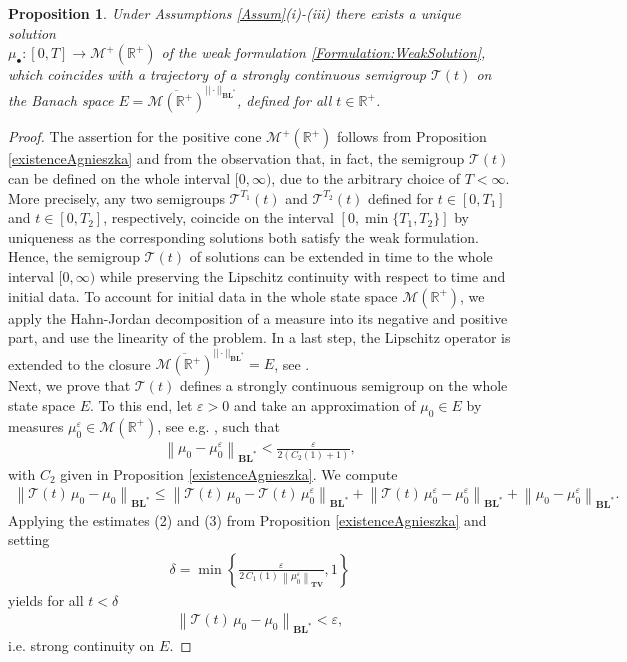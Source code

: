\documentclass[12pt,a4paper]{amsart}
\newtheorem{proposition}[theorem]{Proposition}
\newcommand{\BLN}{\mathbf{BL}}
\newcommand{\TV}{\mathbf{TV}}
\newcommand{\norma}[1]{{\left \|#1\right \|}}
\newcommand{\R}{\mathbb{R}}
\begin{document}
\begin{proposition}\label{stronglycontinuous}
Under Assumptions \ref{Assum}(i)-(iii) there exists a unique solution\\
$\mu_{\bullet} \colon [0,T] \to
\mathcal{M}^+(\R^+)$ of the weak formulation \eqref{Formulation:WeakSolution}, which coincides with a trajectory of a strongly continuous semigroup $\mathcal{T}(t)$ on the Banach space $E=\overline{\mathcal{M}(\mathbb{R}^+)}^{||\cdot ||_{\BLN^*}}$, defined for all $t\in \mathbb{R}^+$.
\end{proposition}
\begin{proof}
The assertion for the positive cone $\mathcal{M}^+(\R^+)$ follows from Proposition \ref{existenceAgnieszka} and from the observation that, in fact, the semigroup $\mathcal{T}(t)$ can be defined on the whole interval $[0,\infty)$, due to the arbitrary choice of $T<\infty$. More precisely, any two semigroups $\mathcal{T}^{T_1}(t)$ and $\mathcal{T}^{T_2}(t)$ defined for $t\in [0,T_1]$ and $t\in [0,T_2]$, respectively,   coincide on the interval $[0, \min\{T_1,T_2\}]$ by uniqueness as the corresponding solutions both satisfy the weak formulation. Hence, the semigroup $\mathcal{T}(t)$ of solutions can be extended in time to the whole interval $[0,\infty)$ while preserving  the Lipschitz continuity with respect to time and initial data. To account for initial data in the whole state space $\mathcal M(\R^+)$, we apply the Hahn-Jordan decomposition of a measure into its negative and positive part, and use the linearity of the problem.  In a last step, the Lipschitz operator is extended to the closure $\overline{\mathcal{M}(\mathbb{R}^+)}^{||\cdot ||_{\BLN^*}}=E$, see \cite[Thm. 2.6]{Amman}.\\
Next, we prove that $\mathcal{T}(t)$ defines a strongly continuous semigroup on the whole state space $E$. To this end, let $\varepsilon>0 $ and take an approximation of $\mu_0 \in E$ by  measures $\mu_0^{\varepsilon}\in \mathcal{M}(\R^+)$, see e.g. \cite[Theorem 8.1]{M3AS_measures}, such that
    \begin{align*}
 \norma{\mu_0 - \mu_0^{\varepsilon}}_{{\BLN}^*}<\frac{\varepsilon}{2(C_2(1)+1)},
 \end{align*}
with $C_2$ given in  Proposition \ref{existenceAgnieszka}. We compute 
\begin{eqnarray*}
 \norma{\mathcal{T}(t)\,\mu_0 - \mu_0}_{{\BLN}^*} \leq  \norma{\mathcal{T}(t)\,\mu_0 - \mathcal{T}(t)\,\mu_0^{\varepsilon}}_{{\BLN}^*} + \norma{\mathcal{T}(t)\,\mu_0^{\varepsilon} - \mu_0^{\varepsilon}}_{{\BLN}^*}+ \norma{\mu_0 - \mu_0^{\varepsilon}}_{{\BLN}^*}. 
\end{eqnarray*}
Applying the estimates (2) and (3) from Proposition \ref{existenceAgnieszka} and setting 
\begin{align*}
\delta= \min\left\{\frac{\varepsilon}{2\,C_1(1)\,\norma{\mu_0^{\varepsilon}}_{\TV}},1\right\}
\end{align*}
yields for all $t<\delta$ 
    \begin{align*}
    \norma{\mathcal{T}(t)\,\mu_0 - \mu_0}_{{\BLN}^*}< \varepsilon,
    \end{align*}
i.e. strong continuity on $E$.
\end{proof}
\end{document}
